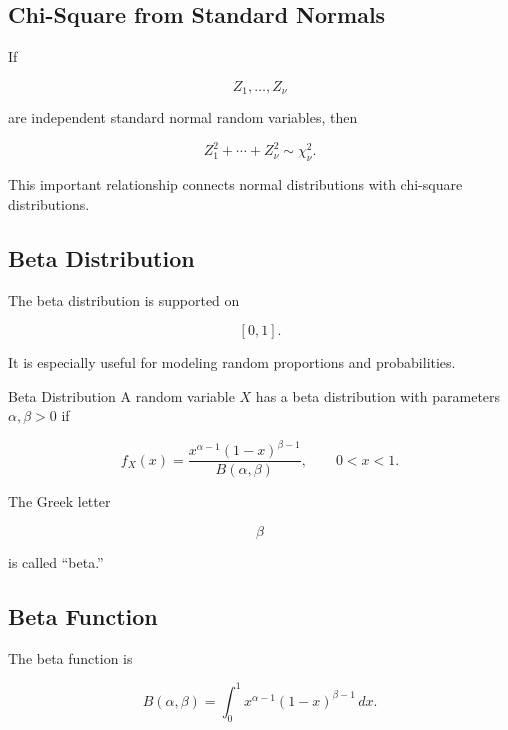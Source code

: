 \subsection{Chi-Square from Standard Normals}
\label{subsec:chi-square-standard-normal}

If

\[
Z_1,\ldots,Z_\nu
\]

are independent standard normal random variables, then

\[
\boxed{
Z_1^2+\cdots+Z_\nu^2
\sim
\chi^2_\nu.
}
\]

This important relationship connects normal distributions with
chi-square distributions.

\subsection{Beta Distribution}
\label{subsec:beta-distribution}

The beta distribution is supported on

\[
[0,1].
\]

It is especially useful for modeling random proportions and
probabilities.

\begin{definitionbox}{Beta Distribution}
A random variable \(X\) has a beta distribution with parameters
\(\alpha,\beta>0\) if

\[
\boxed{
f_X(x)
=
\frac{
x^{\alpha-1}(1-x)^{\beta-1}
}{
B(\alpha,\beta)
},
\qquad
0<x<1.
}
\]
\end{definitionbox}

The Greek letter

\[
\beta
\]

is called ``beta.''

\subsection{Beta Function}
\label{subsec:beta-function}

The beta function is

\[
\boxed{
B(\alpha,\beta)
=
\int_0^1
x^{\alpha-1}(1-x)^{\beta-1}\,dx.
}
\]

